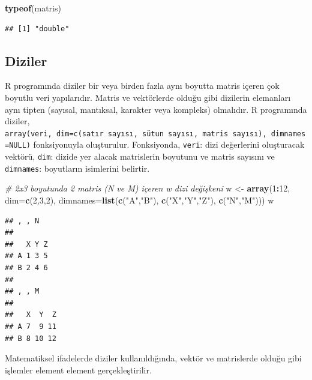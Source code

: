 \documentclass[
]{book}
\newenvironment{Shaded}{\begin{snugshade}}{\end{snugshade}}
\newcommand{\AttributeTok}[1]{\textcolor[rgb]{0.13,0.29,0.53}{#1}}
\newcommand{\CommentTok}[1]{\textcolor[rgb]{0.56,0.35,0.01}{\textit{#1}}}
\newcommand{\DecValTok}[1]{\textcolor[rgb]{0.00,0.00,0.81}{#1}}
\newcommand{\FunctionTok}[1]{\textcolor[rgb]{0.13,0.29,0.53}{\textbf{#1}}}
\newcommand{\NormalTok}[1]{#1}
\newcommand{\OtherTok}[1]{\textcolor[rgb]{0.56,0.35,0.01}{#1}}
\newcommand{\SpecialCharTok}[1]{\textcolor[rgb]{0.81,0.36,0.00}{\textbf{#1}}}
\newcommand{\StringTok}[1]{\textcolor[rgb]{0.31,0.60,0.02}{#1}}
\begin{document}
\begin{Shaded}
\begin{Highlighting}[]
\FunctionTok{typeof}\NormalTok{(matris)}
\end{Highlighting}
\end{Shaded}

\begin{verbatim}
## [1] "double"
\end{verbatim}

\subsection{Diziler}\label{diziler}

R programında diziler bir veya birden fazla aynı boyutta matris içeren çok boyutlu veri yapılarıdır. Matris ve vektörlerde olduğu gibi dizilerin elemanları aynı tipten (sayısal, mantıksal, karakter veya kompleks) olmalıdır. R programında diziler, \texttt{array(veri,\ dim=c(satır\ sayısı,\ sütun\ sayısı,\ matris\ sayısı),\ dimnames=NULL)} fonksiyonuyla oluşturulur. Fonksiyonda, \texttt{veri}: dizi değerlerini oluşturacak vektörü, \texttt{dim}: dizide yer alacak matrislerin boyutunu ve matris sayısını ve \texttt{dimnames}: boyutların isimlerini belirtir.

\begin{Shaded}
\begin{Highlighting}[]
\CommentTok{\# 2x3 boyutunda 2 matris (N ve M) içeren w dizi değişkeni}
\NormalTok{w }\OtherTok{\textless{}{-}} \FunctionTok{array}\NormalTok{(}\DecValTok{1}\SpecialCharTok{:}\DecValTok{12}\NormalTok{, }\AttributeTok{dim=}\FunctionTok{c}\NormalTok{(}\DecValTok{2}\NormalTok{,}\DecValTok{3}\NormalTok{,}\DecValTok{2}\NormalTok{), }
           \AttributeTok{dimnames=}\FunctionTok{list}\NormalTok{(}\FunctionTok{c}\NormalTok{(}\StringTok{"A"}\NormalTok{,}\StringTok{"B"}\NormalTok{), }\FunctionTok{c}\NormalTok{(}\StringTok{"X"}\NormalTok{,}\StringTok{"Y"}\NormalTok{,}\StringTok{"Z"}\NormalTok{), }\FunctionTok{c}\NormalTok{(}\StringTok{"N"}\NormalTok{,}\StringTok{"M"}\NormalTok{))) }
\NormalTok{w}
\end{Highlighting}
\end{Shaded}

\begin{verbatim}
## , , N
## 
##   X Y Z
## A 1 3 5
## B 2 4 6
## 
## , , M
## 
##   X  Y  Z
## A 7  9 11
## B 8 10 12
\end{verbatim}

Matematiksel ifadelerde diziler kullanıldığında, vektör ve matrislerde olduğu gibi işlemler element element gerçekleştirilir.
\end{document}
